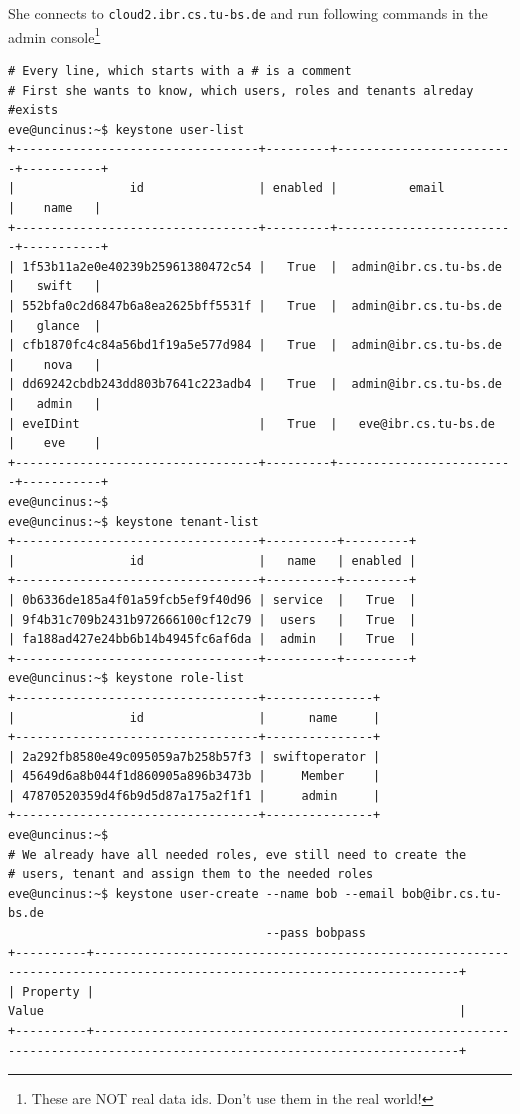 \documentclass[a4paper,ngerman,bibtotocliststotoc]{scrartcl}
\begin{document}
She connects to \verb|cloud2.ibr.cs.tu-bs.de| and run following
commands in the admin console\footnote{These are NOT real data
  ids. Don't use them in the real world!}
\begin{verbatim}
# Every line, which starts with a # is a comment
# First she wants to know, which users, roles and tenants alreday
#exists
eve@uncinus:~$ keystone user-list
+----------------------------------+---------+-------------------------+-----------+
|                id                | enabled |          email          |    name   |
+----------------------------------+---------+-------------------------+-----------+
| 1f53b11a2e0e40239b25961380472c54 |   True  |  admin@ibr.cs.tu-bs.de  |   swift   |
| 552bfa0c2d6847b6a8ea2625bff5531f |   True  |  admin@ibr.cs.tu-bs.de  |   glance  |
| cfb1870fc4c84a56bd1f19a5e577d984 |   True  |  admin@ibr.cs.tu-bs.de  |    nova   |
| dd69242cbdb243dd803b7641c223adb4 |   True  |  admin@ibr.cs.tu-bs.de  |   admin   |
| eveIDint                         |   True  |   eve@ibr.cs.tu-bs.de   |    eve    |
+----------------------------------+---------+-------------------------+-----------+
eve@uncinus:~$
eve@uncinus:~$ keystone tenant-list
+----------------------------------+----------+---------+
|                id                |   name   | enabled |
+----------------------------------+----------+---------+
| 0b6336de185a4f01a59fcb5ef9f40d96 | service  |   True  |
| 9f4b31c709b2431b972666100cf12c79 |  users   |   True  |
| fa188ad427e24bb6b14b4945fc6af6da |  admin   |   True  |
+----------------------------------+----------+---------+
eve@uncinus:~$ keystone role-list
+----------------------------------+---------------+
|                id                |      name     |
+----------------------------------+---------------+
| 2a292fb8580e49c095059a7b258b57f3 | swiftoperator |
| 45649d6a8b044f1d860905a896b3473b |     Member    |
| 47870520359d4f6b9d5d87a175a2f1f1 |     admin     |
+----------------------------------+---------------+
eve@uncinus:~$
# We already have all needed roles, eve still need to create the
# users, tenant and assign them to the needed roles
eve@uncinus:~$ keystone user-create --name bob --email bob@ibr.cs.tu-bs.de 
                                    --pass bobpass
+----------+-------------------------------------------------------------------------------------------------------------------------+
| Property |                                                          Value                                                          |
+----------+-------------------------------------------------------------------------------------------------------------------------+

\end{verbatim}
\end{document}
